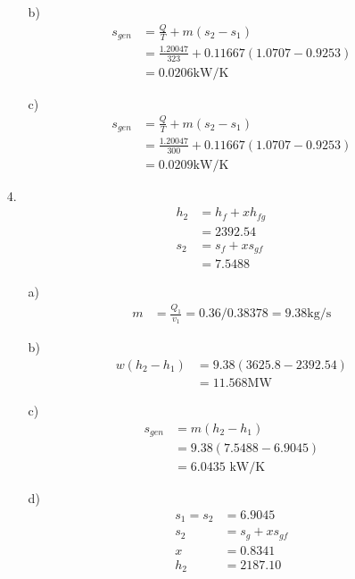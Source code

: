 \documentclass{article}
\begin{document}
\begin{itemize}
\begin{itemize}
        \item [b)]
        \begin{align*}
            s_{gen}&=\frac{Q}{T}+m(s_2-s_1)\\
            &=\frac{1.20047}{323}+0.11667(1.0707-0.9253)\\
            &=0.0206 \text{kW/K}
        \end{align*}
        \item [c)]
        \begin{align*}
            s_{gen}&=\frac{Q}{T}+m(s_2-s_1)\\
            &=\frac{1.20047}{300}+0.11667(1.0707-0.9253)\\
            &=0.0209 \text{kW/K}
        \end{align*}
    \end{itemize}
    \item [4.]
    \begin{align*}
        h_2&=h_f+xh_{fg}\\
        &=2392.54\\
        s_2&=s_f+xs_{gf}\\
        &=7.5488
    \end{align*}
    \begin{itemize}
        \item [a)]
        \begin{align*}
            m &=\frac{Q_1}{v_1}=0.36/0.38378=9.38 \text{kg/s}
        \end{align*}
        \item [b)]
        \begin{align*}
            w(h_2-h_1)&=9.38(3625.8-2392.54)\\
            &=11.568 \text{MW}
        \end{align*}
        \item [c)]
        \begin{align*}
            s_{gen}&=m(h_2-h_1)\\
            &=9.38(7.5488-6.9045)\\
            &=6.0435 \text{ kW/K}
        \end{align*}
        \item [d)]
        \begin{align*}
            s_1=s_2&=6.9045\\
            s_2&=s_g+xs_{gf}\\
            x&=0.8341\\
            h_2 &= 2187.10\\

\end{align*}
\end{itemize}
\end{itemize}
\end{document}
